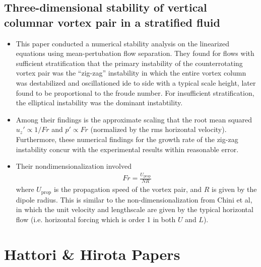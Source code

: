\documentclass{article}
\begin{document}
\subsection{Three-dimensional stability of vertical columnar vortex pair in a
stratified fluid}

\begin{itemize}
    \item This paper conducted a numerical stability analysis on the linearized
    equations using mean-pertubation flow separation. They found for flows
    with sufficient stratification that the primary instability of the
    counterrotating vortex pair was the ``zig-zag'' instability in which the
    entire vortex column was destabilized and oscillationed ide to side with a
    typical scale height, later found to be proportional to the froude number.
    For insufficient stratification, the elliptical instability was the dominant
    instabtility. 
    \item Among their findings is the approximate scaling that the root mean
    squared $u_z' \propto
    1/Fr$ and $p' \propto Fr$ (normalized by the rms horizontal velocity).
    Furthermore, these numerical findings for the growth rate of the zig-zag
    instability concur with the experimental results
    within reasonable error. 
    \item Their nondimensionalization involved 
    \begin{gather*}
        Fr = \frac{U_{\text{prop}}}{NR}
    \end{gather*}
    where $U_{\text{prop}}$ is the propagation speed of the vortex pair, and $R$
    is given by the dipole radius. This is similar to the non-dimensionalization
    from Chini et al, in which the unit velocity and lengthscale are given by
    the typical horizontal flow (i.e. horizontal forcing which is order 1 in
    both $U$ and $L$). 
\end{itemize}


\section{Hattori \& Hirota Papers}
\end{document}
